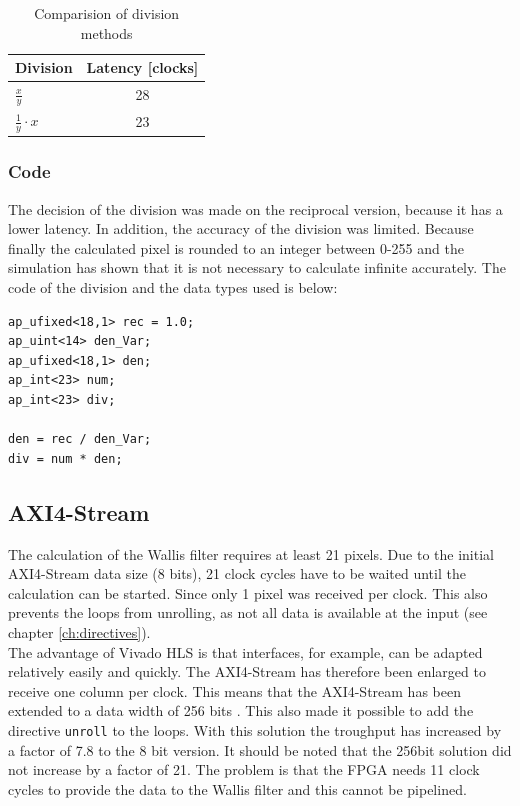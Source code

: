 \begin{table}[tb!]
    \centering
    \begin{tabular}{l c}
        \toprule
        Division & Latency [clocks]  \\
        \midrule
        $\frac{x}{y}$ & 28 
        \\
        $\frac{1}{y} \cdot x$ & 23 
        \\
        \bottomrule
    \end{tabular}
    \caption{Comparision of division methods}
    \label{tab:c_div}
\end{table}

\subsubsection*{Code}
The decision of the division was made on the reciprocal version, because it has a lower latency. In addition, the accuracy of the division was limited. Because finally the calculated pixel is rounded to an integer between 0-255 and the simulation has shown that it is not necessary to calculate infinite accurately. The code of the division and the data types used is below:

\begin{minipage}{\textwidth}
\begin{lstlisting}[style=CStyle, caption=Calculation of the division for the Wallis filter, label=lst:division]
ap_ufixed<18,1> rec = 1.0;
ap_uint<14> den_Var;
ap_ufixed<18,1> den;
ap_int<23> num;
ap_int<23> div;

den = rec / den_Var;
div = num * den;
\end{lstlisting}
\end{minipage}


\subsection{AXI4-Stream} \label{ch:ip:axi}
The calculation of the Wallis filter requires at least 21 pixels. Due to the initial AXI4-Stream data size (8 bits), 21 clock cycles have to be waited until the calculation can be started. Since only 1 pixel was received per clock. This also prevents the loops from unrolling, as not all data is available at the input (see chapter \ref{ch:directives}). \\
The advantage of Vivado HLS is that interfaces, for example, can be adapted relatively easily and quickly. The AXI4-Stream has therefore been enlarged to receive one column per clock. This means that the AXI4-Stream has been extended to a data width of 256 bits \cite{axi_stream}. This also made it possible to add the directive \texttt{unroll} to the loops. With this solution the troughput has increased by a factor of 7.8 to the 8 bit version. It should be noted that the 256bit solution did not increase by a factor of 21. The problem is that the FPGA needs 11 clock cycles to provide the data to the Wallis filter and this cannot be pipelined.

